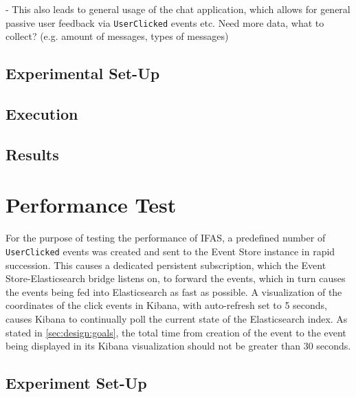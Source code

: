 - This also leads to general usage of the chat application, which allows for general passive user feedback via \texttt{UserClicked} events etc.
Need more data, what to collect? (e.g. amount of messages, types of messages)

%

\subsection{Experimental Set-Up}

\subsection{Execution}

\subsection{Results}

\section{Performance Test}
\label{sec:evaluation:performance}

For the purpose of testing the performance of \ac{IFAS}, a predefined number of \texttt{UserClicked} events was created and sent to the Event Store instance in rapid succession.
This causes a dedicated persistent subscription, which the Event Store-Elasticsearch bridge listens on, to forward the events, which in turn causes the events being fed into Elasticsearch as fast as possible.
A visualization of the coordinates of the click events in Kibana, with auto-refresh set to 5 seconds, causes Kibana to continually poll the current state of the Elasticsearch index.
As stated in \cref{sec:design:goals}, the total time from creation of the event to the event being displayed in its Kibana visualization should not be greater than 30 seconds.

\subsection{Experiment Set-Up}

